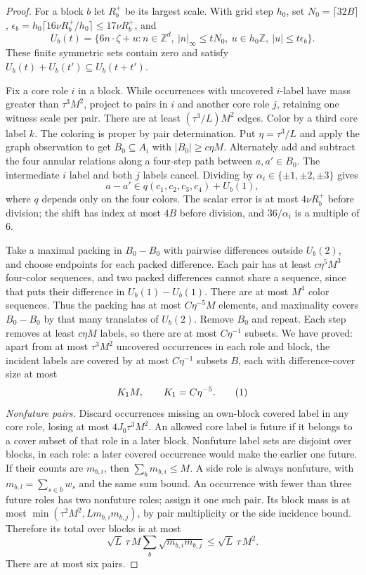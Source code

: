 \documentclass[11pt]{article}
\theoremstyle{definition}
\newcommand{\Z}{\mathbb Z}
\newcommand{\eqtag}[1]{\refstepcounter{equation}\tag{\theequation}\label{#1}}
\numberwithin{equation}{section}
\begin{document}
\begin{proof}
For a block $b$ let $R_b^+$ be its largest scale. With grid step $h_0$, set $N_0=\lceil32B\rceil$, $\epsilon_b=h_0\lceil16\nu R_b^+/h_0\rceil\le17\nu R_b^+$, and
\[
 U_b(t)=\{6n\cdot\zeta+u: n\in\Z^d,\ |n|_\infty\le tN_0,\ u\in h_0\Z,\ |u|\le t\epsilon_b\}.
\]
These finite symmetric sets contain zero and satisfy $U_b(t)+U_b(t')\subseteq U_b(t+t')$.

Fix a core role $i$ in a block. While occurrences with uncovered $i$-label have mass greater than $\tau^3M^2$, project to pairs in $i$ and another core role $j$, retaining one witness scale per pair. There are at least $(\tau^3/L)M^2$ edges. Color by a third core label $k$. The coloring is proper by pair determination. Put $\eta=\tau^3/L$ and apply the graph observation to get $B_0\subseteq A_i$ with $|B_0|\ge c\eta M$. Alternately add and subtract the four annular relations along a four-step path between $a,a'\in B_0$. The intermediate $i$ label and both $j$ labels cancel. Dividing by $\alpha_i\in\{\pm1,\pm2,\pm3\}$ gives
\[
 a-a'\in q(c_1,c_2,c_3,c_4)+U_b(1),
\]
where $q$ depends only on the four colors. The scalar error is at most $4\nu R_b^+$ before division; the shift has index at most $4B$ before division, and $36/\alpha_i$ is a multiple of $6$.

Take a maximal packing in $B_0-B_0$ with pairwise differences outside $U_b(2)$, and choose endpoints for each packed difference. Each pair has at least $c\eta^5M^3$ four-color sequences, and two packed differences cannot share a sequence, since that puts their difference in $U_b(1)-U_b(1)$. There are at most $M^4$ color sequences. Thus the packing has at most $C\eta^{-5}M$ elements, and maximality covers $B_0-B_0$ by that many translates of $U_b(2)$. Remove $B_0$ and repeat. Each step removes at least $c\eta M$ labels, so there are at most $C\eta^{-1}$ subsets. We have proved: apart from at most $\tau^3M^2$ uncovered occurrences in each role and block, the incident labels are covered by at most $C\eta^{-1}$ subsets $B$, each with difference-cover size at most
\[
 K_1M,\qquad K_1=C\eta^{-5}.
 \eqtag{eq:two-cover-counts}
\]
\emph{Nonfuture pairs.} Discard occurrences missing an own-block covered label in any core role, losing at most $4J_0\tau^3M^2$. An allowed core label is future if it belongs to a cover subset of that role in a later block. Nonfuture label sets are disjoint over blocks, in each role: a later covered occurrence would make the earlier one future. If their counts are $m_{b,i}$, then $\sum_bm_{b,i}\le M$. A side role is always nonfuture, with $m_{b,l}=\sum_{s\in b}w_s$ and the same sum bound. An occurrence with fewer than three future roles has two nonfuture roles; assign it one such pair. Its block mass is at most $\min(\tau^2M^2,Lm_{b,i}m_{b,j})$, by pair multiplicity or the side incidence bound. Therefore its total over blocks is at most
\[
 \sqrt L\,\tau\,M\sum_b\sqrt{m_{b,i}m_{b,j}}\le\sqrt L\,\tau\,M^2.
\]
There are at most six pairs.


\end{proof}
\end{document}
